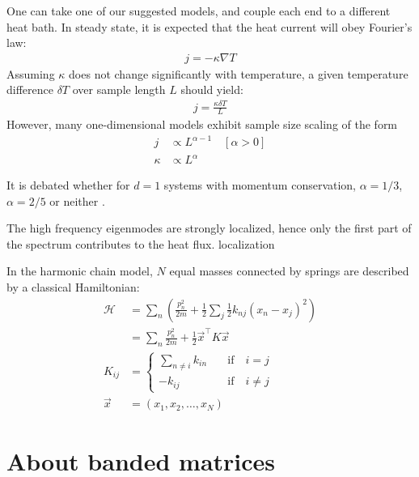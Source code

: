 One can take one of our suggested models, and couple each end to a different heat bath.
In steady state, it is expected that the heat current will obey Fourier's law:
%
\begin{align}
j = -\kappa\nabla T
\end{align}
%
Assuming $\kappa$ does not change significantly with temperature, a given 
temperature difference $\delta T$ over sample length $L$ should yield:
%
\begin{align}
j = \frac{\kappa \delta T}{L}
\end{align}
%
However, many one-dimensional models 
\cite{narayan_anomalous_2002,dhar_heat_2001,lepri_anomalous_1998,savin_heat_2002} 
exhibit sample size scaling of the form
%
\begin{align}
j         &\propto L^{\alpha-1}\quad [\alpha>0] \\
\kappa    &\propto L^\alpha
\end{align}

It is debated whether for $d=1$ systems
with momentum conservation,  $\alpha=1/3$,$\alpha=2/5$ or neither
\cite{narayan_anomalous_2002,delfini_comment_2008,dhar_dhar_2008,wang_power-law_2011}.



The high frequency eigenmodes are strongly localized, hence only the
first part of the spectrum contributes to the heat flux\cite{lepri_thermal_2001}.
localization


In the harmonic chain model, $N$ equal masses connected by springs are described by a classical Hamiltonian:
%
\begin{align}
\mathcal{H} &= \sum_n \left( \frac{p_n^2}{2m} + \frac{1}{2}\sum_{j} \frac{1}{2}k_{nj} (x_n-x_j)^2 \right) \\
            &= \sum_{n} \frac{p_n^2}{2m} +  \frac{1}{2}\vec{x}^{\intercal} K \vec{x} \\
            K_{ij} &= \begin{cases} 
            \sum_{n\ne i} k_{in}  \quad &\textrm{if}\quad i=j \\ 
            - k_{ij}  \quad &\textrm{if}\quad i\ne j 
            \end{cases}\\
            \vec{x} &= (x_1,x_2,\ldots,x_N)
\end{align}
%

 


\section{About banded matrices}


